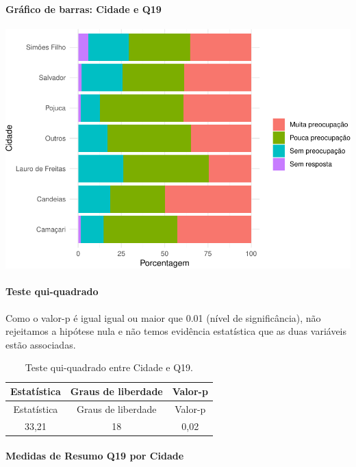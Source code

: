 \documentclass[]{article}
\let\oldparagraph\paragraph
\renewcommand{\paragraph}[1]{\oldparagraph{#1}\mbox{}}
\begin{document}
\hypertarget{gruxe1fico-de-barras-cidade-e-q19}{%
\paragraph{Gráfico de barras: Cidade e Q19}\label{gruxe1fico-de-barras-cidade-e-q19}}

\begin{center}\includegraphics[width=0.75\linewidth]{relatorio_covid19_files/figure-latex/unnamed-chunk-309-1} \end{center}

\hypertarget{teste-qui-quadrado-27}{%
\paragraph{Teste qui-quadrado}\label{teste-qui-quadrado-27}}

Como o valor-p é igual igual ou maior que 0.01 (nível de significância), não rejeitamos a hipótese nula e não temos evidência estatística que as duas variáveis estão associadas.

\begin{longtable}[]{@{}ccc@{}}
\caption{\label{tab:unnamed-chunk-311}Teste qui-quadrado entre Cidade e Q19.}\tabularnewline
\toprule
Estatística & Graus de liberdade & Valor-p\tabularnewline
\midrule
\endfirsthead
\toprule
Estatística & Graus de liberdade & Valor-p\tabularnewline
\midrule
\endhead
33,21 & 18 & 0,02\tabularnewline
\bottomrule
\end{longtable}

\cleardoublepage

\hypertarget{medidas-de-resumo-q19-por-cidade}{%
\paragraph{Medidas de Resumo Q19 por Cidade}\label{medidas-de-resumo-q19-por-cidade}}
\end{document}
